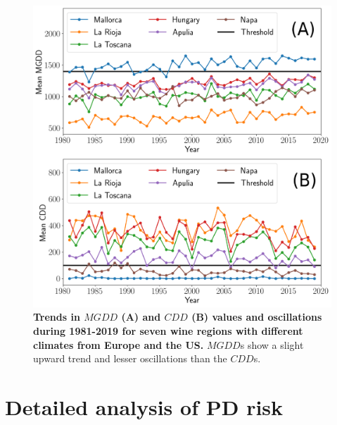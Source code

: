 \begin{figure}[H]
    \centering
    \includegraphics[width=\textwidth]{Figures/Mean_MGDD_CDD_sites.png}
    \caption[MGDD and CDD oscillations in different wine-growing
        regions]{\textbf{Trends in $MGDD$ (A) and $CDD$ (B) values and
            oscillations during 1981-2019 for seven wine regions with different
            climates
            from Europe and the US.} $MGDD$s show a slight upward trend and
        lesser
        oscillations than the $CDD$s.}
    \label{fig:sup_climatic_oscilations} %
\end{figure}

\section{Detailed analysis of PD risk}

